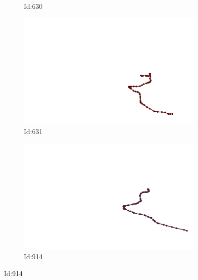\documentclass[12pt,twoside]{report}
\begin{document}
\begin{figure}
\begin{subfigure}[b]{0.20\textwidth}
\caption{Id:630}
\end{subfigure}
\begin{subfigure}[b]{0.20\textwidth}
\centering
\includegraphics[width=\textwidth]{../../trajectories/631.png}
\caption{Id:631}
\end{subfigure}
\begin{subfigure}[b]{0.20\textwidth}
\centering
\includegraphics[width=\textwidth]{../../trajectories/914.png}
\caption{Id:914}
\end{subfigure}
\end{figure}
\end{document}
